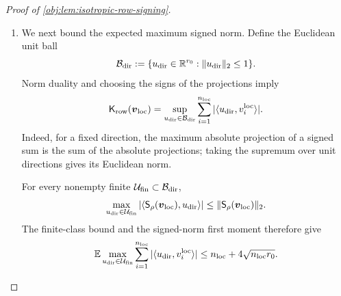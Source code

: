 \documentclass[11pt]{article}
\begin{document}
\begin{proof}[Proof of \cref{obj:lem:isotropic-row-signing}]
\begin{enumerate}
For any local sample, averaging over the fair signs cancels the off-diagonal terms:
\[
\mathbb E_\rho\|\mathsf S_\rho(\boldsymbol v_{\rm loc})\|_2^2
=\sum_{i=1}^{n_{\rm loc}}\|v_i^{\rm loc}\|_2^2.
\]
Thus
\[
\mathbb E\|\mathsf S_\rho(\boldsymbol v_{\rm loc})\|_2^2
=n_{\rm loc}r_0,
\qquad
\mathbb E\|\mathsf S_\rho(\boldsymbol v_{\rm loc})\|_2
\leq\sqrt{n_{\rm loc}r_0}.
\]
For every fixed \(u_{\rm dir}\in\mathbb R^{r_0}\), the projection estimate gives
\[
\mathbb E_{\rm right}
\sum_{i'=1}^{n_{\rm right}}
|\langle u_{\rm dir},v_{i'}^{\rm right}\rangle|
\leq n_{\rm right}\|u_{\rm dir}\|_2.
\]
Independence allows this estimate to be applied conditional on the left sample and its signs. Interchanging the integrable expectations yields
\[
\mathbb E
\sum_{i'=1}^{n_{\rm right}}
|\langle\mathsf S_\rho(\boldsymbol v_{\rm left}),v_{i'}^{\rm right}\rangle|
\leq
n_{\rm right}\sqrt{n_{\rm left}r_0}.
\]
After integrating the conditional cross-group bound, we obtain
\[
\mathbb E\mathsf H_{\rm cross}(\boldsymbol v_{\rm left},\boldsymbol v_{\rm right})
\leq
n_{\rm left}\mathbb E\mathsf K_{\rm row}(\boldsymbol v_{\rm right})
+4n_{\rm right}\sqrt{n_{\rm left}r_0}.
\]

\item We next bound the expected maximum signed norm.
Define the Euclidean unit ball
\[
\mathcal B_{\rm dir}
:=\{u_{\rm dir}\in\mathbb R^{r_0}:\|u_{\rm dir}\|_2\leq1\}.
\]
Norm duality and choosing the signs of the projections imply
\[
\mathsf K_{\rm row}(\boldsymbol v_{\rm loc})
=
\sup_{u_{\rm dir}\in\mathcal B_{\rm dir}}
\sum_{i=1}^{n_{\rm loc}}|\langle u_{\rm dir},v_i^{\rm loc}\rangle|.
\]
Indeed, for a fixed direction, the maximum absolute projection of a signed sum is the sum of the absolute projections; taking the supremum over unit directions gives its Euclidean norm.

For every nonempty finite \(\mathcal U_{\rm fin}\subset\mathcal B_{\rm dir}\),
\[
\max_{u_{\rm dir}\in\mathcal U_{\rm fin}}
|\langle\mathsf S_\rho(\boldsymbol v_{\rm loc}),u_{\rm dir}\rangle|
\leq\|\mathsf S_\rho(\boldsymbol v_{\rm loc})\|_2.
\]
The finite-class bound and the signed-norm first moment therefore give
\[
\mathbb E\max_{u_{\rm dir}\in\mathcal U_{\rm fin}}
\sum_{i=1}^{n_{\rm loc}}|\langle u_{\rm dir},v_i^{\rm loc}\rangle|
\leq n_{\rm loc}+4\sqrt{n_{\rm loc}r_0}.
\]


\end{enumerate}
\end{proof}
\end{document}

